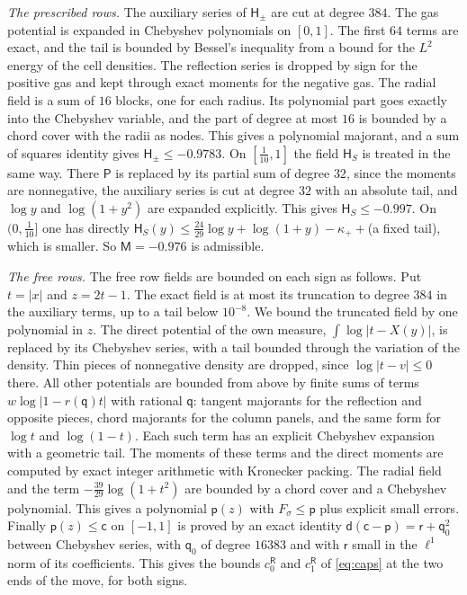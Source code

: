 \emph{The prescribed rows.} The auxiliary series of $\mathsf H_\pm$ are cut at degree $384$. The gas potential is expanded in Chebyshev polynomials on $[0,1]$. The first $64$ terms are exact, and the tail is bounded by Bessel's inequality from a bound for the $L^2$ energy of the cell densities.
The reflection series is dropped by sign for the positive gas and kept through exact moments for the negative gas. The radial field is a sum of $16$ blocks, one for each radius. Its polynomial part goes exactly into the Chebyshev variable, and the part of degree at most $16$ is bounded by
a chord cover with the radii as nodes. This gives a polynomial majorant, and a sum of squares identity gives $\mathsf H_\pm\le-0.9783$. On $[\frac1{10},1]$ the field $\mathsf H_S$ is treated in the same way. There $\mathsf P$ is replaced by its partial sum of degree $32$, since the moments are nonnegative, the auxiliary series is cut at degree $32$ with an absolute tail, and
$\log y$ and $\log(1+y^2)$ are expanded explicitly. This gives $\mathsf H_S\le-0.997$. On $(0,\frac1{10}]$ one has directly $\mathsf H_S(y)\le\frac{24}{29}\log y+\log(1+y)-\kappa_++$(a fixed tail), which is smaller. So $\mathsf M=-0.976$ is admissible.

\emph{The free rows.} The free row fields are bounded on each sign as follows. Put $t=|x|$ and $z=2t-1$. The exact field is at most its truncation to degree $384$ in the auxiliary terms, up to a tail
below $10^{-8}$. We bound the truncated field by one polynomial in $z$. The direct potential of the own measure, $\int\log|t-X(y)|$, is replaced by its Chebyshev series,
with a tail bounded through the variation of the density. Thin pieces of nonnegative density are dropped, since $\log|t-v|\le0$ there. All other potentials
are bounded from above by finite sums of terms $w\log|1-r(\mathsf q)t|$ with rational $\mathsf q$: tangent majorants for the reflection and opposite pieces, chord majorants for the
column panels, and the same form for $\log t$ and $\log(1-t)$. Each such term has an explicit Chebyshev expansion with a geometric tail. The moments of these terms and the
direct moments are computed by exact integer arithmetic with Kronecker packing. The radial field and the term $-\frac{39}{29}\log(1+t^2)$ are bounded by a chord cover and a
Chebyshev polynomial. This gives a polynomial $\mathsf p(z)$ with $F_\sigma\le\mathsf p$ plus explicit small errors. Finally $\mathsf p(z)\le\mathsf c$ on $[-1,1]$ is proved by an exact identity
$\mathsf d(\mathsf c-\mathsf p)=\mathsf r+\mathsf q_0^2$ between Chebyshev series, with $\mathsf q_0$ of degree $16383$ and with $\mathsf r$ small in the $\ell^1$ norm of its coefficients. This gives
the bounds $c^{\mathsf R}_0$ and $c^{\mathsf R}_1$ of \eqref{eq:caps} at the two ends of the move, for both signs.
